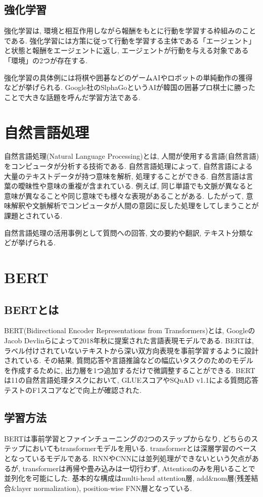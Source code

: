 \subsection{強化学習}
強化学習は, 環境と相互作用しながら報酬をもとに行動を学習する枠組みのことである. 強化学習には方策に従って行動を学習する主体である「エージェント」と状態と報酬をエージェントに返し, エージェントが行動を与える対象である「環境」の2つが存在する. 

強化学習の具体例には将棋や囲碁などのゲームAIやロボットの単純動作の獲得などが挙げられる. Google社のSlphaGoというAIが韓国の囲碁プロ棋士に勝ったことで大きな話題を呼んだ学習方法である. 


\section{自然言語処理}
自然言語処理(Natural Language Processing)とは, 人間が使用する言語(自然言語)をコンピュータが分析する技術である. 自然言語処理によって, 自然言語による大量のテキストデータが持つ意味を解析, 処理することができる. 
自然言語は言葉の曖昧性や意味の重複が含まれている. 例えば, 同じ単語でも文脈が異なると意味が異なることや同じ意味でも様々な表現があることがある. したがって, 意味解釈や文脈解析でコンピュータが人間の意図に反した処理をしてしまうことが課題とされている. 

自然言語処理の活用事例として質問への回答, 文の要約や翻訳, テキスト分類などが挙げられる. 



\section{BERT}
\subsection{BERTとは}
BERT(Bidirectional Encoder Representations from Transformers)\cite{bert}とは, GoogleのJacob Devlinらによって2018年秋に提案された言語表現モデルである. BERTは, ラベル付けされていないテキストから深い双方向表現を事前学習するように設計されている. その結果, 質問応答や言語推論などの幅広いタスクのためのモデルを作成するために, 出力層を1つ追加するだけで微調整することができる. BERTは11の自然言語処理タスクにおいて, GLUEスコアやSQuAD v1.1による質問応答テストのF1スコアなどで向上が確認された\cite{bert}. 

\subsection{学習方法}
BERTは事前学習とファインチューニングの2つのステップからなり, どちらのステップにおいてもtransformerモデルを用いる. transformerとは深層学習のベースとなっているモデルである. RNNやCNNには並列処理ができないという欠点があるが, transformerは再帰や畳み込みは一切行わず, Attentionのみを用いることで並列化を可能にした. 基本的な構成はmulti-head attention層, add\&nom層(残差結合\&layer normalization), position-wise FNN層となっている. 

